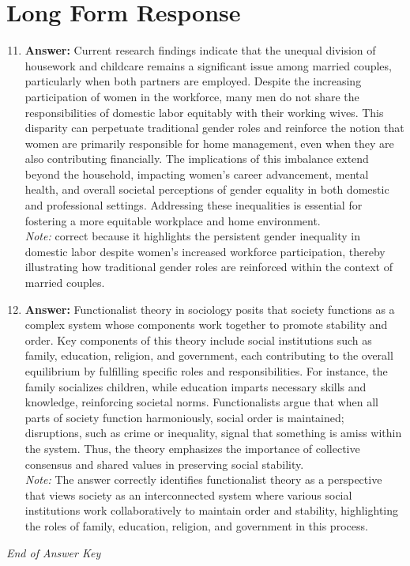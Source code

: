 \documentclass[12pt]{article}
\begin{document}
\section*{Long Form Response}
\begin{enumerate}[label=\arabic*.]
\setcounter{enumi}{10}
\item \textbf{Answer:} Current research findings indicate that the unequal division of housework and childcare remains a significant issue among married couples, particularly when both partners are employed. Despite the increasing participation of women in the workforce, many men do not share the responsibilities of domestic labor equitably with their working wives. This disparity can perpetuate traditional gender roles and reinforce the notion that women are primarily responsible for home management, even when they are also contributing financially. The implications of this imbalance extend beyond the household, impacting women's career advancement, mental health, and overall societal perceptions of gender equality in both domestic and professional settings. Addressing these inequalities is essential for fostering a more equitable workplace and home environment.
\\ \textit{Note:} correct because it highlights the persistent gender inequality in domestic labor despite women's increased workforce participation, thereby illustrating how traditional gender roles are reinforced within the context of married couples.
\item \textbf{Answer:} Functionalist theory in sociology posits that society functions as a complex system whose components work together to promote stability and order. Key components of this theory include social institutions such as family, education, religion, and government, each contributing to the overall equilibrium by fulfilling specific roles and responsibilities. For instance, the family socializes children, while education imparts necessary skills and knowledge, reinforcing societal norms. Functionalists argue that when all parts of society function harmoniously, social order is maintained; disruptions, such as crime or inequality, signal that something is amiss within the system. Thus, the theory emphasizes the importance of collective consensus and shared values in preserving social stability.
\\ \textit{Note:} The answer correctly identifies functionalist theory as a perspective that views society as an interconnected system where various social institutions work collaboratively to maintain order and stability, highlighting the roles of family, education, religion, and government in this process.
\end{enumerate}

\vfill
\noindent\textit{End of Answer Key}
\end{document}

